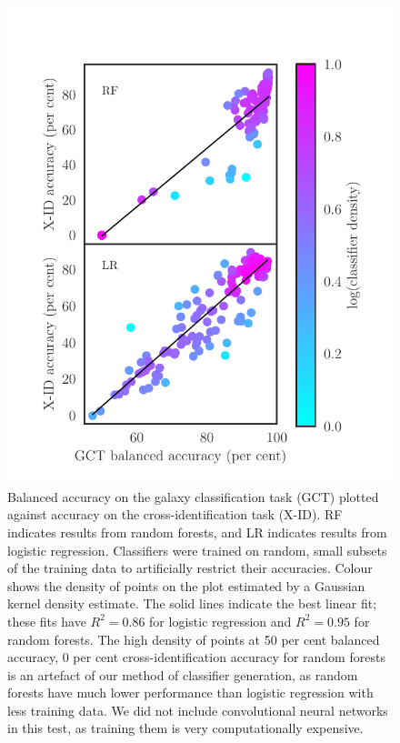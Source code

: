 \documentclass[fleqn,usenatbib,usedcolumn]{mnras}
\begin{document}
    \begin{figure}
      \centering
      \includegraphics[width=\columnwidth]{gct-to-xid.pdf}
      \caption{Balanced accuracy on the galaxy classification task (GCT) plotted
      against accuracy on the cross-identification task (X-ID). RF indicates
      results from random forests, and LR indicates results from logistic
      regression. Classifiers were trained on random, small subsets of the
      training data to artificially restrict their accuracies. Colour shows
      the density of points on the plot estimated by a Gaussian kernel density
      estimate. The solid lines indicate the best linear fit; these fits have
      $R^2 = 0.86$ for logistic regression and $R^2 = 0.95$ for random
      forests. The high density of points at 50 per cent balanced accuracy, 0
      per cent cross-identification accuracy for random forests is an artefact
      of our method of classifier generation, as random forests have much
      lower performance than logistic regression with less training data. We
      did not include convolutional neural networks in this test, as training
      them is very computationally expensive.
      \label{fig:gct-to-xid}}
    \end{figure}
\end{document}

